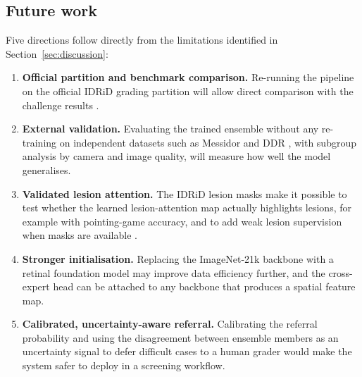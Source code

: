 \subsection{Future work}
Five directions follow directly from the limitations identified in Section~\ref{sec:discussion}:
\begin{enumerate}
\item \textbf{Official partition and benchmark comparison.} Re-running the pipeline on the official IDRiD grading
  partition will allow direct comparison with the challenge results \citep{porwal2020idrid}.
\item \textbf{External validation.} Evaluating the trained ensemble without any re-training on independent datasets
  such as Messidor \citep{decenciere2014messidor} and DDR \citep{li2019ddr}, with subgroup analysis by camera and image
  quality, will measure how well the model generalises.
\item \textbf{Validated lesion attention.} The IDRiD lesion masks make it possible to test whether the learned
  lesion-attention map actually highlights lesions, for example with pointing-game accuracy, and to add weak lesion
  supervision when masks are available \citep{zhou2019collaborative}.
\item \textbf{Stronger initialisation.} Replacing the ImageNet-21k backbone with a retinal foundation model
  \citep{zhou2023foundation} may improve data efficiency further, and the cross-expert head can be attached to any
  backbone that produces a spatial feature map.
\item \textbf{Calibrated, uncertainty-aware referral.} Calibrating the referral probability
  \citep{guo2017calibration} and using the disagreement between ensemble members as an uncertainty signal to
  defer difficult cases to a human grader \citep{araujo2020drgraduate,lakshminarayanan2017simple} would make the system
  safer to deploy in a screening workflow.
\end{enumerate}

